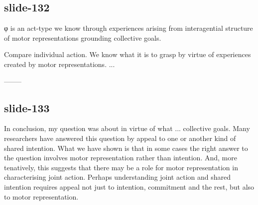 \documentclass[12pt,\papersize]{extarticle}
\begin{document}
\subsection{slide-132}
φ is an act-type we know through experiences arising from interagential structure of motor representations grounding collective goals.

Compare individual action.
We know what it is to grasp by virtue of experiences created by motor representations.
...

--------
\subsection{slide-133}
In conclusion, my question was about in virtue of what ... collective goals.
Many researchers have answered this question by appeal to one or another kind of shared intention.
What we have shown is that in some cases the right answer to the question involves
motor representation rather than intention.
And, more tenatively, this suggests that there may be a role for motor representation
in characterising joint action.
Perhaps understanding joint action and shared intention requires appeal not just to intention, commitment and the rest,
but also to motor representation.


    










\end{document}
